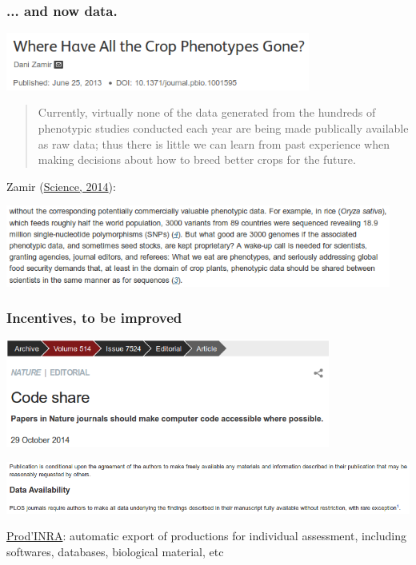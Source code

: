 \documentclass[c]{beamer} %
\begin{document}
\begin{frame}
  \frametitle{... and now data.}
  \begin{center}
    \includegraphics[width=0.75\textwidth,height=0.90\textheight,keepaspectratio=true]{2013-06_DZamir_title}%
  \end{center}
  \pause
  \begin{quote}
    Currently, virtually none of the data generated from the hundreds of phenotypic studies conducted each year are being made publically available as raw data; thus there is little we can learn from past experience when making decisions about how to breed better crops for the future.
  \end{quote}
  
  \bigskip
  \pause
  
  Zamir (\href{http://dx.doi.org/10.1126/science.1258941}{Science, 2014}):
  \begin{center}
    \includegraphics[width=0.95\textwidth,height=0.90\textheight,keepaspectratio=true]{2014-09_DZamir_text}%
  \end{center}
\end{frame}

\begin{frame}
  \frametitle{Incentives, to be improved}
  \begin{center}
    \includegraphics[width=0.8\textwidth,height=0.90\textheight,keepaspectratio=true]{2014-10_Nature_code-share}%
  \end{center}
  
  \begin{center}
    \includegraphics[width=1\textwidth,height=1.2\textheight,keepaspectratio=true]{2014-10_PLoS_data-availability}%
  \end{center}
  
  \bigskip
  \pause
  
  \href{http://prodinra.inra.fr/?locale=en}{Prod'INRA}: automatic export of productions for individual assessment, including softwares, databases, biological material, etc
\end{frame}
\end{document}

